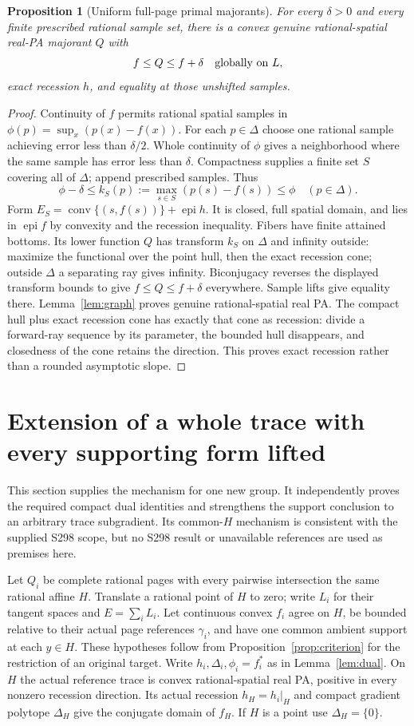 \documentclass[11pt]{article}
\newtheorem{proposition}[theorem]{Proposition}
\newcommand{\epi}{\operatorname{epi}}
\newcommand{\conv}{\operatorname{conv}}
\begin{document}
\begin{proposition}[Uniform full-page primal majorants]\label{prop:primal}
For every $\delta>0$ and every finite prescribed rational sample set, there is a convex genuine rational-spatial real-PA majorant $Q$ with
\[
f\leq Q\leq f+\delta\quad\hbox{globally on }L,
\]
exact recession $h$, and equality at those unshifted samples.
\end{proposition}
\begin{proof}
Continuity of $f$ permits rational spatial samples in $\phi(p)=\sup_x(p(x)-f(x))$. For each $p\in\Delta$ choose one rational sample achieving error less than $\delta/2$. Whole continuity of $\phi$ gives a neighborhood where the same sample has error less than $\delta$. Compactness supplies a finite set $S$ covering all of $\Delta$; append prescribed samples. Thus
\[
\phi-\delta\leq k_S(p):=\max_{s\in S}(p(s)-f(s))\leq\phi\quad(p\in\Delta).
\]
Form $E_S=\conv\{(s,f(s))\}+\epi h$. It is closed, full spatial domain, and lies in $\epi f$ by convexity and the recession inequality. Fibers have finite attained bottoms. Its lower function $Q$ has transform $k_S$ on $\Delta$ and infinity outside: maximize the functional over the point hull, then the exact recession cone; outside $\Delta$ a separating ray gives infinity. Biconjugacy reverses the displayed transform bounds to give $f\leq Q\leq f+\delta$ everywhere. Sample lifts give equality there. Lemma~\ref{lem:graph} proves genuine rational-spatial real PA. The compact hull plus exact recession cone has exactly that cone as recession: divide a forward-ray sequence by its parameter, the bounded hull disappears, and closedness of the cone retains the direction. This proves exact recession rather than a rounded asymptotic slope.
\end{proof}

\section{Extension of a whole trace with every supporting form lifted}
This section supplies the mechanism for one new group. It independently proves the required compact dual identities and strengthens the support conclusion to an arbitrary trace subgradient. Its common-$H$ mechanism is consistent with the supplied S298 scope, but no S298 result or unavailable references are used as premises here.

Let $Q_i$ be complete rational pages with every pairwise intersection the same rational affine $H$. Translate a rational point of $H$ to zero; write $L_i$ for their tangent spaces and $E=\sum_iL_i$. Let continuous convex $f_i$ agree on $H$, be bounded relative to their actual page references $\gamma_i$, and have one common ambient support at each $y\in H$. These hypotheses follow from Proposition~\ref{prop:criterion} for the restriction of an original target. Write $h_i,\Delta_i,\phi_i=f_i^*$ as in Lemma~\ref{lem:dual}. On $H$ the actual reference trace is convex rational-spatial real PA, positive in every nonzero recession direction. Its actual recession $h_H=h_i|_H$ and compact gradient polytope $\Delta_H$ give the conjugate domain of $f_H$. If $H$ is a point use $\Delta_H=\{0\}$.
\end{document}
